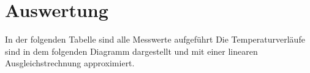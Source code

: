 \section{Auswertung}
\label{sec:Auswertung}
In der folgenden Tabelle sind alle Messwerte aufgeführt
Die Temperaturverläufe sind in dem folgenden Diagramm dargestellt und mit einer
linearen Ausgleichstrechnung approximiert.
